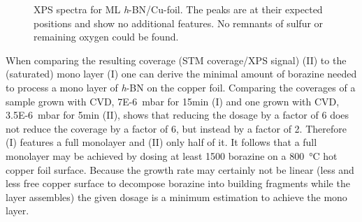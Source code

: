 \begin{figure}[!h]
	\centering
	\caption{XPS spectra for ML \textit{h}-BN/Cu-foil. The peaks are at their expected positions\cite{kidambi_situ_2014} and show no additional features. No remnants of sulfur or remaining oxygen could be found.}
	\label{fig:xps-self-grown}
\end{figure}

When comparing the resulting coverage (STM coverage/XPS signal) (II) to the (saturated) mono layer (I) one can derive the minimal amount of borazine needed to process a mono layer of \textit{h}-BN on the copper foil. Comparing the coverages of a sample grown with CVD, \SI{7E-6}{\milli \bar} for 15min (I) and one grown with CVD, \SI{3.5E-6}{\milli \bar} for 5min (II), shows that reducing the dosage by a factor of 6 does not reduce the coverage by a factor of 6, but instead by a factor of 2. Therefore (I) features a full monolayer and (II) only half of it. It follows that a full monolayer may be achieved by dosing at least \SI{1500}{\langmuir} borazine on a \SI{800}{\degreeCelsius} hot copper foil surface. 
Because the growth rate may certainly not be linear (less and less free copper surface to decompose borazine into building fragments while the layer assembles) the given dosage is a minimum estimation to achieve the mono layer.

